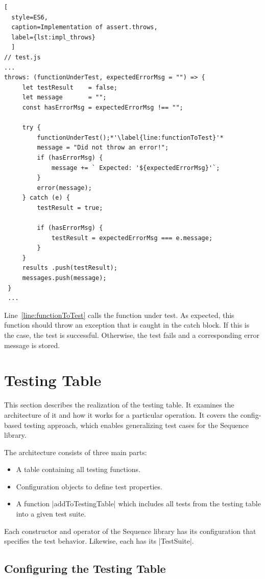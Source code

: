 \begin{lstlisting}[
  style=ES6, 
  caption=Implementation of assert.throws,
  label={lst:impl_throws}
  ]
// test.js
...
throws: (functionUnderTest, expectedErrorMsg = "") => {
     let testResult    = false;
     let message       = "";
     const hasErrorMsg = expectedErrorMsg !== "";

     try {
         functionUnderTest();*'\label{line:functionToTest}'*
         message = "Did not throw an error!";
         if (hasErrorMsg) {
             message += ` Expected: '${expectedErrorMsg}'`;
         }
         error(message);
     } catch (e) {
         testResult = true;

         if (hasErrorMsg) {
             testResult = expectedErrorMsg === e.message;
         }
     }
     results .push(testResult);
     messages.push(message);
 }
 ...
\end{lstlisting}


Line~\ref{line:functionToTest} calls the function under test. As expected, this
function should throw an exception that is caught in the catch block. If this
is the case, the test is successful. Otherwise, the test fails and a
corresponding error message is stored.

\section{Testing Table}
\label{sec:Testing Table}
This section describes the realization of the testing table. It examines the
architecture of it and how it works for a particular operation. It covers the
config-based testing approach, which enables generalizing test cases for the
Sequence library.

The architecture consists of three main parts:
\begin{itemize}
  \item{A table containing all testing functions.}
  \item{Configuration objects to define test properties.}
  \item{A function |addToTestingTable| which includes all tests from the testing
    table into a given test suite.}
\end{itemize}

Each constructor and operator of the Sequence library has its configuration
that specifies the test behavior. Likewise, each has its |TestSuite|. 

\subsection{Configuring the Testing Table}
\label{sub:Configuring the Testing Table}

